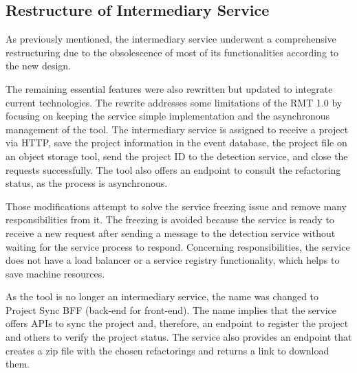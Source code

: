 
\subsection{Restructure of Intermediary Service}
\label{sub-restruct-intermediary}

As previously mentioned, the intermediary service underwent a comprehensive restructuring due to the obsolescence of most of its functionalities according to the new design. 

The remaining essential features were also rewritten but updated to integrate current technologies. The rewrite addresses some limitations of the RMT 1.0 by focusing on keeping the service simple implementation and the asynchronous management of the tool. The intermediary service is assigned to receive a project via HTTP, save the project information in the event database, the project file on an object storage tool, send the project ID to the detection service, and close the requests successfully. The tool also offers an endpoint to consult the refactoring status, as the process is asynchronous.

Those modifications attempt to solve the service freezing issue and remove many responsibilities from it. The freezing is avoided because the service is ready to receive a new request after sending a message to the detection service without waiting for the service process to respond. Concerning responsibilities, the service does not have a load balancer or a service registry functionality, which helps to save machine resources.

As the tool is no longer an intermediary service, the name was changed to Project Sync BFF (back-end for front-end). The name implies that the service offers APIs to sync the project and, therefore, an endpoint to register the project and others to verify the project status. The service also provides an endpoint that creates a zip file with the chosen refactorings and returns a link to download them.


